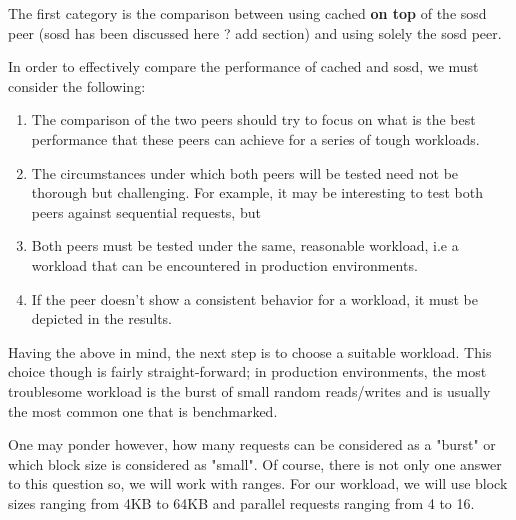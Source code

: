 The first category is the comparison between using cached \textbf{on top} of 
the sosd peer (sosd has been discussed here ? \fixme add section) and using 
solely the sosd peer.

\begin{comment}
The category's goal is to "defend" one of the core thesis arguments, that 
tiering is a key element that will improve the performance of Archipelago.  
\end{comment}

In order to effectively compare the performance of cached and sosd, we must 
consider the following: 

\begin{enumerate}
	\item The comparison of the two peers should try to focus on what is 
		the best performance that these peers can achieve for a series 
		of tough workloads.
	\item The circumstances under which both peers will be tested need not 
		be thorough but challenging. For example, it may be interesting 
		to test both peers against sequential requests, but
		
	\item Both peers must be tested under the same, reasonable workload, 
		i.e a workload that can be encountered in production 
		environments.
	\item If the peer doesn't show a consistent behavior for a workload, it 
		must be depicted in the results.
\end{enumerate}

Having the above in mind, the next step is to choose a suitable workload.  This 
choice though is fairly straight-forward; in production environments, the most 
troublesome workload is the burst of small random reads/writes and is usually 
the most common one that is benchmarked.  

One may ponder however, how many requests can be considered as a "burst" or 
which block size is considered as "small". Of course, there is not only one 
answer to this question so, we will work with ranges. For our workload, we will 
use block sizes ranging from 4KB to 64KB and parallel requests ranging from 4 
to 16.

